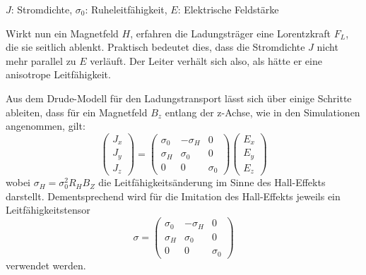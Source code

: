\documentclass[12pt, a4paper]{article}
\renewcommand{\footnotesize}{\fontsize{10pt}{12pt}\selectfont}
\begin{document}
\vspace{-0.8em}
\begin{center}
	\footnotesize
	$J$: Stromdichte, $\sigma_0$: Ruheleitfähigkeit, $E$: Elektrische Feldstärke
\end{center}
{
	\raggedright
	Wirkt nun ein Magnetfeld $H$, erfahren die Ladungsträger eine Lorentzkraft $F_L$, die sie seitlich ablenkt. Praktisch bedeutet dies, dass die Stromdichte $J$ nicht mehr parallel zu $E$ verläuft. Der Leiter verhält sich also, als hätte er eine anisotrope Leitfähigkeit.}\newline
Aus dem Drude-Modell für den Ladungstransport lässt sich über einige Schritte ableiten, dass für ein Magnetfeld $B_z$ entlang der z-Achse, wie in den Simulationen angenommen, gilt:
\begin{equation}
	\begin{pmatrix} J_x \\ J_y \\ J_z \end{pmatrix}=\begin{pmatrix} \sigma_0 & -\sigma_H & 0 \\ \sigma_H & \sigma_0 & 0 \\ 0 & 0 & \sigma_0\end{pmatrix} \begin{pmatrix} E_x \\ E_y \\ E_z \end{pmatrix}
	\tag{4.10}
	\label{4.10}
\end{equation}
wobei $\sigma_H=\sigma_0^2R_HB_Z$ die Leitfähigkeitsänderung im Sinne des Hall-Effekts darstellt.\newline%
Dementsprechend wird für die Imitation des Hall-Effekts jeweils ein Leitfähigkeitstensor 
\begin{equation}
	\sigma=\begin{pmatrix} \sigma_0 & -\sigma_H & 0 \\ \sigma_H & \sigma_0 & 0 \\ 0 & 0 & \sigma_0\end{pmatrix}
	\tag{4.11}
	\label{4.11}
\end{equation}
verwendet werden.
\end{document}
